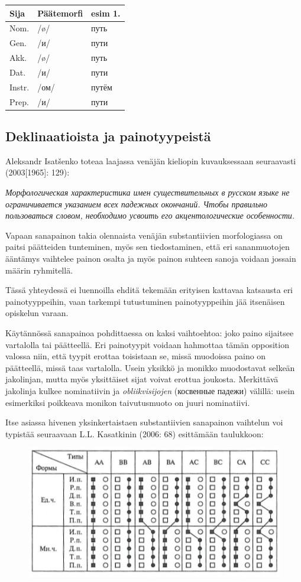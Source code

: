\documentclass[]{scrartcl}
\begin{document}
\begin{longtable}[c]{@{}lll@{}}
\toprule
Sija & Päätemorfi & esim 1.\tabularnewline
\midrule
\endhead
Nom. & /ø/ & путь\tabularnewline
Gen. & /и/ & пути\tabularnewline
Akk. & /ø/ & путь\tabularnewline
Dat. & /и/ & пути\tabularnewline
Instr. & /ом/ & путём\tabularnewline
Prep. & /и/ & пути\tabularnewline
\bottomrule
\end{longtable}

\subsection{Deklinaatioista ja
painotyypeistä}\label{deklinaatioista-ja-painotyypeistuxe4}

Aleksandr Isatšenko toteaa laajassa venäjän kieliopin kuvauksessaan
seuraavasti (2003{[}1965{]}: 129):

\emph{Морфологическая характеристика имен существительных в русском
языке не ограничивается указанием всех падежных окончаний. Чтобы
правильно пользоваться словом, необходимо усвоить его акцентологические
особенности.}

Vapaan sanapainon takia olennaista venäjän substantiivien morfologiassa
on paitsi päätteiden tunteminen, myös sen tiedostaminen, että eri
sananmuotojen ääntämys vaihtelee painon osalta ja myös painon suhteen
sanoja voidaan jossain määrin ryhmitellä.

Tässä yhteydessä ei luennoilla ehditä tekemään erityisen kattavaa
katsausta eri painotyyppeihin, vaan tarkempi tutustuminen
painotyyppeihin jää itsenäisen opiskelun varaan.

Käytännössä sanapainoa pohdittaessa on kaksi vaihtoehtoa: joko paino
sijaitsee vartalolla tai päätteellä. Eri painotyypit voidaan hahmottaa
tämän opposition valossa niin, että tyypit erottaa toisistaan se, missä
muodoissa paino on päätteellä, missä taas vartalolla. Usein yksikkö ja
monikko muodostavat selkeän jakolinjan, mutta myös yksittäiset sijat
voivat erottua joukosta. Merkittävä jakolinja kulkee nominatiivin ja
\emph{obliikvisijojen} (косвенные падежи) välillä: usein esimerkiksi
poikkeava monikon taivutusmuoto on juuri nominatiivi.

Itse asiassa hivenen yksinkertaistaen substantiivien sanapainon
vaihtelun voi typistää seuraavaan L.L. Kasatkinin (2006: 68) esittämään
taulukkoon:

\begin{figure}[htbp]
\centering
\includegraphics{materiaalit/kasatkin.png}
\caption{}
\end{figure}
\end{document}
